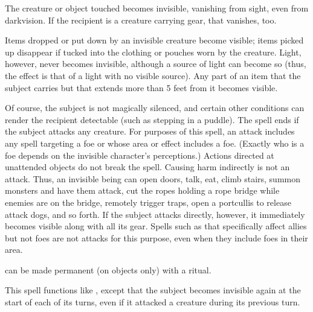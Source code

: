 \spellrng{\rngclose}
\begin{spelleffect}
  The creature or object touched becomes invisible, vanishing from sight, even from darkvision. If the recipient is a creature carrying gear, that vanishes, too.
  \par Items dropped or put down by an invisible creature become visible; items picked up disappear if tucked into the clothing or pouches worn by the creature. Light, however, never becomes invisible, although a source of light can become so (thus, the effect is that of a light with no visible source). Any part of an item that the subject carries but that extends more than 5 feet from it becomes visible.
  \par Of course, the subject is not magically silenced, and certain other conditions can render the recipient detectable (such as stepping in a puddle). The spell ends if the subject attacks any creature. For purposes of this spell, an attack includes any spell targeting a foe or whose area or effect includes a foe. (Exactly who is a foe depends on the invisible character's perceptions.) Actions directed at unattended objects do not break the spell. Causing harm indirectly is not an attack. Thus, an invisible being can open doors, talk, eat, climb stairs, summon monsters and have them attack, cut the ropes holding a rope bridge while enemies are on the bridge, remotely trigger traps, open a portcullis to release attack dogs, and so forth. If the subject attacks directly, however, it immediately becomes visible along with all its gear. Spells such as  that specifically affect allies but not foes are not attacks for this purpose, even when they include foes in their area.
\end{spelleffect}
\begin{spellnotes}
   can be made permanent (on objects only) with a  ritual.
\end{spellnotes}

\begin{spelleffect}
  This spell functions like , except that the subject becomes invisible again at the start of each of its turns, even if it attacked a creature during its previous turn.
\end{spelleffect}

